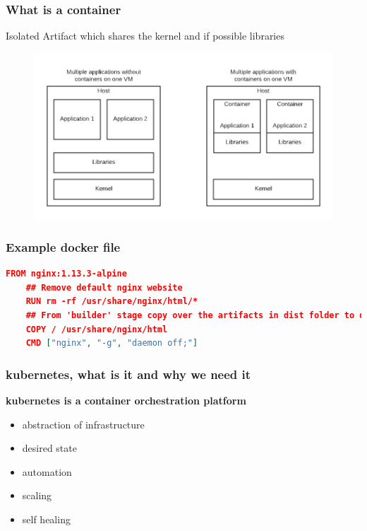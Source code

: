 \documentclass{beamer}
\begin{document}
\begin{frame}
\frametitle{What is a container}
Isolated Artifact which shares the kernel and if possible libraries
    \begin{figure}
        \includegraphics[width=\linewidth]{images/ContainerComparsion.png}
    \end{figure}
\end{frame}

\begin{frame}[fragile]
\frametitle{Example docker file}
\textbf{}
\begin{lstlisting}[language=json,firstnumber=1]
    FROM nginx:1.13.3-alpine
    ## Remove default nginx website
    RUN rm -rf /usr/share/nginx/html/*
    ## From 'builder' stage copy over the artifacts in dist folder to default nginx public folder
    COPY / /usr/share/nginx/html
    CMD ["nginx", "-g", "daemon off;"]
\end{lstlisting}
\end{frame}


\begin{frame}
\frametitle{kubernetes, what is it and why we need it}
\textbf{kubernetes is a container orchestration platform}
\\
    \begin{itemize}
        \item abstraction of infrastructure
        \item \alert{desired state}
        \item \alert{automation}
        \item scaling
        \item self healing
    \end{itemize}
\end{frame}
\end{document}
